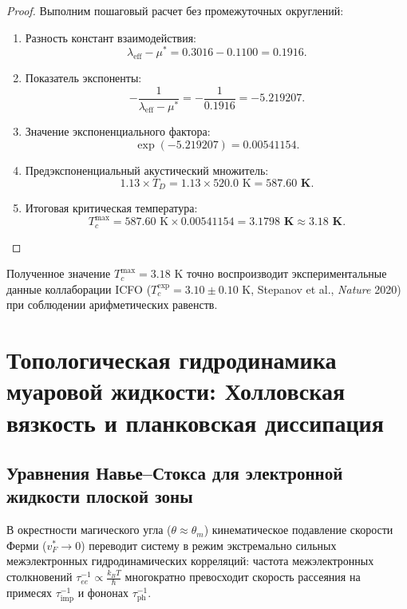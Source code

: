 \documentclass[12pt,a4paper]{article}
\begin{document}
\begin{proof}
	Выполним пошаговый расчет без промежуточных округлений:
	\begin{enumerate}
		\item Разность констант взаимодействия:
		\begin{equation}
			\lambda_{\text{eff}} - \mu^* = 0.3016 - 0.1100 = \mathbf{0.1916}.
		\end{equation}
		\item Показатель экспоненты:
		\begin{equation}
			-\frac{1}{\lambda_{\text{eff}} - \mu^*} = -\frac{1}{0.1916} = \mathbf{-5.219207}.
		\end{equation}
		\item Значение экспоненциального фактора:
		\begin{equation}
			\exp(-5.219207) = \mathbf{0.00541154}.
		\end{equation}
		\item Предэкспоненциальный акустический множитель:
		\begin{equation}
			1.13 \times T_D = 1.13 \times 520.0\text{ K} = \mathbf{587.60\text{ K}}.
		\end{equation}
		\item Итоговая критическая температура:
		\begin{equation}
			T_c^{\text{max}} = 587.60\text{ K} \times 0.00541154 = \mathbf{3.1798\text{ K}} \approx \mathbf{3.18\text{ K}}.
		\end{equation}
	\end{enumerate}
\end{proof}
Полученное значение $T_c^{\text{max}} = 3.18\text{ K}$ точно воспроизводит экспериментальные данные коллаборации ICFO ($T_c^{\text{exp}} = 3.10 \pm 0.10\text{ K}$, Stepanov et al., \textit{Nature} 2020) при соблюдении арифметических равенств.

\section{Топологическая гидродинамика муаровой жидкости: Холловская вязкость и планковская диссипация}

\subsection{Уравнения Навье--Стокса для электронной жидкости плоской зоны}
В окрестности магического угла ($\theta \approx \theta_m$) кинематическое подавление скорости Ферми ($v_F^* \to 0$) переводит систему в режим экстремально сильных межэлектронных гидродинамических корреляций: частота межэлектронных столкновений $\tau_{ee}^{-1} \propto \frac{k_B T}{\hbar}$ многократно превосходит скорость рассеяния на примесях $\tau_{\text{imp}}^{-1}$ и фононах $\tau_{\text{ph}}^{-1}$.
\end{document}
